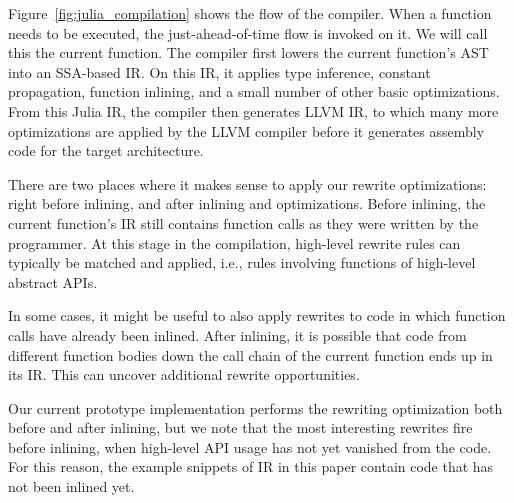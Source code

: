 Figure~\ref{fig:julia_compilation} shows the flow of the compiler. When a function needs to be executed, the just-ahead-of-time flow is invoked on it. We will call this the current function. The compiler first lowers the current function's AST into an SSA-based IR. On this IR, it applies type inference, constant propagation, function inlining, and a small number of other basic optimizations. From this Julia IR, the compiler then generates LLVM IR, to which many more optimizations are applied by the LLVM compiler before it generates assembly code for the target architecture. 

There are two places where it makes sense to apply our rewrite optimizations: right before inlining, and after inlining and optimizations.
Before inlining, the current function's IR still contains function calls as they were written by the programmer.
At this stage in the compilation, high-level rewrite rules can typically be matched and applied, i.e., rules involving functions of high-level abstract APIs.  

In some cases, it might be useful to also apply rewrites to code in which function calls have already been inlined.
After inlining, it is possible that code from different function bodies down the call chain of the current function ends up in its IR. This can uncover additional rewrite opportunities. 


Our current prototype implementation performs the rewriting optimization both before and after inlining, but we note that the most interesting rewrites fire before inlining, when high-level API usage has not yet vanished from the code.
For this reason, the example snippets of IR in this paper contain code that has not been inlined yet.


